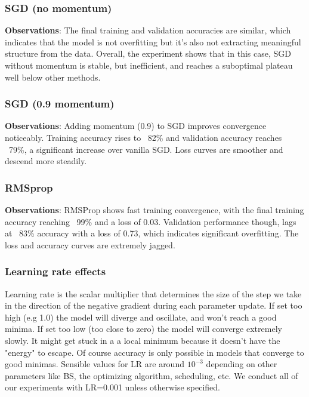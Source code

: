 \documentclass[12pt]{article}
\begin{document}
	\subsubsection{SGD (no momentum)}
	
	
	\textbf{Observations}: The final training and validation accuracies are similar, which indicates that the model is not overfitting but it's also not extracting meaningful structure from the data. Overall, the experiment shows that in this case, SGD without momentum is stable, but inefficient, and reaches a suboptimal plateau well below other methods.
		
	\subsubsection{SGD (0.9 momentum)}
	
	\textbf{Observations}: Adding momentum (0.9) to SGD improves convergence noticeably. Training accuracy rises to ~82\% and validation accuracy reaches ~79\%, a significant increase over vanilla SGD. Loss curves are smoother and descend more steadily.
	
	
		
		
	\subsubsection{RMSprop}
	
	
		\textbf{Observations}: RMSProp shows fast training convergence, with the final training accuracy reaching ~99\% and a loss of 0.03. Validation performance though, lags at ~83\% accuracy with a loss of 0.73, which indicates significant overfitting. The loss and accuracy curves are extremely jagged.
	
		\subsubsection{Learning rate effects}
	Learning rate is the scalar multiplier that determines the size of the step we take in the direction of the negative gradient during each parameter update. If set too high (e.g 1.0) the model will diverge and oscillate, and won't reach a good minima. If set too low (too close to zero) the model will converge extremely slowly. It might get stuck in a a local minimum because it doesn't have the "energy" to escape. Of course accuracy is only possible in models that converge to good minimas. Sensible values for LR are around $10^{-3}$ depending on other parameters like BS, the optimizing algorithm, scheduling, etc. We conduct all of our experiments with LR=0.001 unless otherwise specified.
	
\end{document}
